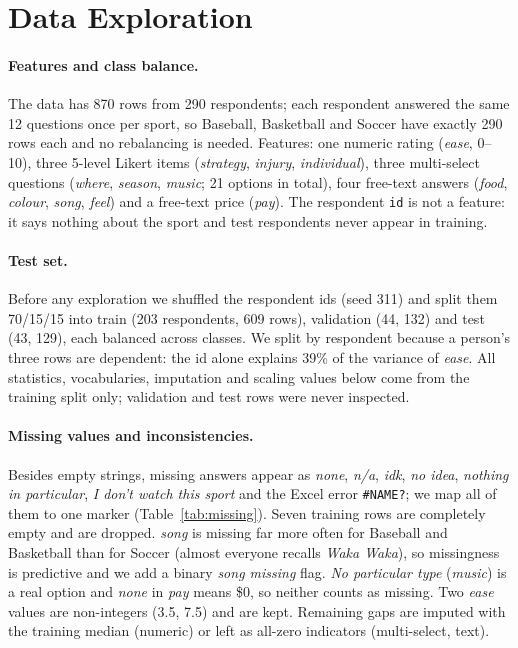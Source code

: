 ﻿%

\section{Data Exploration}

\paragraph{Features and class balance.}
The data has 870 rows from 290 respondents; each respondent answered the same
12 questions once per sport, so Baseball, Basketball and Soccer have exactly 290
rows each and no rebalancing is needed. Features: one numeric rating
(\emph{ease}, 0--10), three 5-level Likert items (\emph{strategy},
\emph{injury}, \emph{individual}), three multi-select questions (\emph{where},
\emph{season}, \emph{music}; 21 options in total), four free-text answers
(\emph{food}, \emph{colour}, \emph{song}, \emph{feel}) and a free-text price
(\emph{pay}). The respondent \texttt{id} is not a feature: it says nothing about
the sport and test respondents never appear in training.

\paragraph{Test set.}
Before any exploration we shuffled the respondent ids (seed 311) and split them
70/15/15 into train (203 respondents, 609 rows), validation (44, 132) and test
(43, 129), each balanced across classes. We split by respondent because a
person's three rows are dependent: the id alone explains 39\% of the variance of
\emph{ease}. All statistics, vocabularies, imputation and scaling values below
come from the training split only; validation and test rows were never
inspected.

\paragraph{Missing values and inconsistencies.}
Besides empty strings, missing answers appear as \emph{none}, \emph{n/a},
\emph{idk}, \emph{no idea}, \emph{nothing in particular}, \emph{I don't watch
this sport} and the Excel error \texttt{\#NAME?}; we map all of them to one
marker (Table~\ref{tab:missing}). Seven training rows are completely empty and
are dropped. \emph{song} is missing far more often for Baseball and Basketball
than for Soccer (almost everyone recalls \emph{Waka Waka}), so missingness is
predictive and we add a binary \emph{song missing} flag. \emph{No particular
type} (\emph{music}) is a real option and \emph{none} in \emph{pay} means \$0, so
neither counts as missing. Two \emph{ease} values are non-integers (3.5, 7.5) and
are kept. Remaining gaps are imputed with the training median (numeric) or left
as all-zero indicators (multi-select, text).

